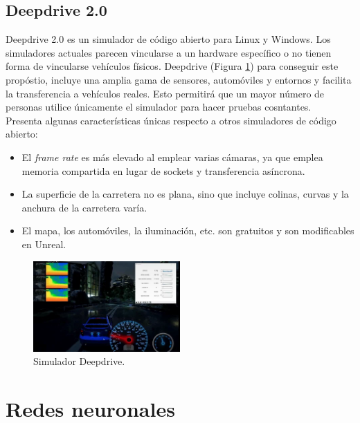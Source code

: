 \subsection{Deepdrive 2.0}

Deepdrive 2.0 \cite{deepdrive} es un simulador de código abierto para Linux y Windows. Los simuladores actuales parecen vincularse a un hardware específico o no tienen forma de vincularse vehículos físicos. Deepdrive (Figura \ref{fig.deepdrive}) para conseguir este propóstio, incluye una amplia gama de sensores, automóviles y entornos y facilita la transferencia a vehículos reales. Esto permitirá que un mayor número de personas utilice únicamente el simulador para hacer pruebas cosntantes.\\

Presenta algunas características únicas respecto a otros simuladores de código abierto:

\begin{itemize}
\item El \textit{frame rate} es más elevado al emplear varias cámaras, ya que emplea memoria compartida en lugar de sockets y transferencia asíncrona.
\item La superficie de la carretera no es plana, sino que incluye colinas, curvas y la anchura de la carretera varía.
\item El mapa, los automóviles, la iluminación, etc. son gratuitos y son modificables en Unreal.
\end{itemize}

\begin{figure}
\begin{center}
	\includegraphics[width=0.5\textwidth]{figures/Estado_arte/deepdrive.png}
   \caption{Simulador Deepdrive.}
	\label{fig.deepdrive}
\end{center}
\end{figure}


\section{Redes neuronales}

